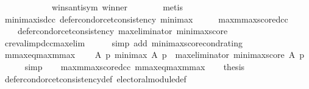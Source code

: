 \begin{isabellebody}
\ \ \ \ \ \ \ \ \ \ \ \ wins{\isacharunderscore}{\kern0pt}antisym\ winner\isanewline
\ \ \ \ \ \ \isamarkupfalse%
\ metis\isanewline
\ \ \isamarkupfalse%
\isanewline
{}\isamarkupfalse%
%
\endisatagproof
{\isafoldproof}%
%
\isadelimproof
\isanewline
%
\endisadelimproof
\isanewline
{}\isamarkupfalse%
\ minimax{\isacharunderscore}{\kern0pt}is{\isacharunderscore}{\kern0pt}dcc{\isacharcolon}{\kern0pt}\ {\isachardoublequoteopen}defer{\isacharunderscore}{\kern0pt}condorcet{\isacharunderscore}{\kern0pt}consistency\ minimax{\isachardoublequoteclose}\isanewline
%
\isadelimproof
%
\endisadelimproof
%
\isatagproof
{}\isamarkupfalse%
\ {\isacharminus}{\kern0pt}\isanewline
\ \ \isamarkupfalse%
\ max{\isacharunderscore}{\kern0pt}mmaxscore{\isacharunderscore}{\kern0pt}dcc{\isacharcolon}{\kern0pt}\isanewline
\ \ \ \ {\isachardoublequoteopen}defer{\isacharunderscore}{\kern0pt}condorcet{\isacharunderscore}{\kern0pt}consistency\ {\isacharparenleft}{\kern0pt}max{\isacharunderscore}{\kern0pt}eliminator\ minimax{\isacharunderscore}{\kern0pt}score{\isacharparenright}{\kern0pt}{\isachardoublequoteclose}\isanewline
\ \ \ \ \isamarkupfalse%
\ cr{\isacharunderscore}{\kern0pt}eval{\isacharunderscore}{\kern0pt}imp{\isacharunderscore}{\kern0pt}dcc{\isacharunderscore}{\kern0pt}max{\isacharunderscore}{\kern0pt}elim\isanewline
\ \ \ \ \isamarkupfalse%
\ {\isacharparenleft}{\kern0pt}simp\ add{\isacharcolon}{\kern0pt}\ minimax{\isacharunderscore}{\kern0pt}score{\isacharunderscore}{\kern0pt}cond{\isacharunderscore}{\kern0pt}rating{\isacharparenright}{\kern0pt}\isanewline
\ \ \isamarkupfalse%
\ mmax{\isacharunderscore}{\kern0pt}eq{\isacharunderscore}{\kern0pt}max{\isacharunderscore}{\kern0pt}mmax{\isacharcolon}{\kern0pt}\isanewline
\ \ \ \ {\isachardoublequoteopen}{\isasymAnd}A\ p{\isachardot}{\kern0pt}\ {\isacharparenleft}{\kern0pt}minimax\ A\ p\ {\isasymequiv}\ max{\isacharunderscore}{\kern0pt}eliminator\ minimax{\isacharunderscore}{\kern0pt}score\ A\ p{\isacharparenright}{\kern0pt}{\isachardoublequoteclose}\isanewline
\ \ \ \ \isamarkupfalse%
\ simp\isanewline
\ \ \isamarkupfalse%
\ max{\isacharunderscore}{\kern0pt}mmaxscore{\isacharunderscore}{\kern0pt}dcc\ mmax{\isacharunderscore}{\kern0pt}eq{\isacharunderscore}{\kern0pt}max{\isacharunderscore}{\kern0pt}mmax\isanewline
\ \ \isamarkupfalse%
\ {\isacharquery}{\kern0pt}thesis\isanewline
\ \ \ \ \isamarkupfalse%
\ defer{\isacharunderscore}{\kern0pt}condorcet{\isacharunderscore}{\kern0pt}consistency{\isacharunderscore}{\kern0pt}def\ electoral{\isacharunderscore}{\kern0pt}module{\isacharunderscore}{\kern0pt}def\isanewline

\end{isabellebody}
